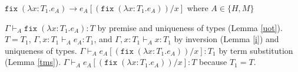 \begin{case}
$\mathtt{fix}\;(\lambda x:T_{1}.e_{A})\rightarrow e_{A}[(\mathtt{fix}\;(\lambda x:T_{1}.e_{A}))/x]$ where $A\in\lbrace H,M\rbrace$

$\Gamma\vdash_{A}\mathtt{fix}\;(\lambda x:T_{1}.e_{A}):T$ by premise and uniqueness of types (Lemma \ref{uot}).  $T=T_{1}$, $\Gamma,x:T_{1}\vdash_{A}e_{A}:T_{1}$, and $\Gamma,x:T_{1}\vdash_{A}x:T_{1}$ by inversion (Lemma \ref{i}) and uniqueness of types.  $\Gamma\vdash_{A}e_{A}[(\mathtt{fix}\;(\lambda x:T_{1}.e_{A}))/x]:T_{1}$ by term substitution (Lemma \ref{tms}).  $\Gamma\vdash_{A}e_{A}[(\mathtt{fix}\;(\lambda x:T_{1}.e_{A}))/x]:T$ because $T_{1}=T$.
\end{case}